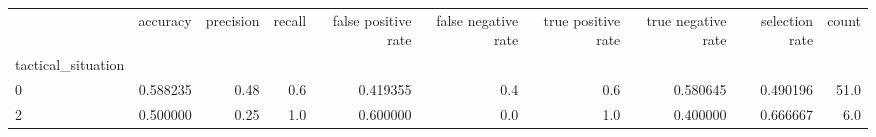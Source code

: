 \begin{tabular}{lrrrrrrrrr}
\toprule
{} &  accuracy &  precision &  recall &  false positive rate &  false negative rate &  true positive rate &  true negative rate &  selection rate &  count \\
tactical\_situation &           &            &         &                      &                      &                     &                     &                 &        \\
\midrule
0                  &  0.588235 &       0.48 &     0.6 &             0.419355 &                  0.4 &                 0.6 &            0.580645 &        0.490196 &   51.0 \\
2                  &  0.500000 &       0.25 &     1.0 &             0.600000 &                  0.0 &                 1.0 &            0.400000 &        0.666667 &    6.0 \\
\bottomrule
\end{tabular}
